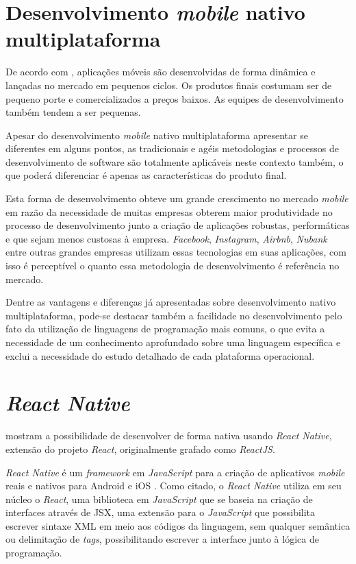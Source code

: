     \section{Desenvolvimento \textit{mobile} nativo multiplataforma}

    De acordo com , aplicações móveis são desenvolvidas de forma dinâmica e lançadas no mercado em pequenos ciclos. Os produtos finais costumam ser de pequeno porte e comercializados a preços baixos. As equipes de desenvolvimento também tendem a ser pequenas. 
    
    Apesar do desenvolvimento \textit{mobile} nativo multiplataforma apresentar se diferentes em alguns pontos, as tradicionais e agéis metodologias e processos de desenvolvimento de software são totalmente aplicáveis neste contexto também, o que poderá diferenciar é apenas as características do produto final.
    
    Esta forma de desenvolvimento obteve um grande crescimento no mercado \textit{mobile} em razão da necessidade de muitas empresas obterem maior produtividade no processo de desenvolvimento junto a criação de aplicações robustas, performáticas e que sejam menos custosas à empresa. \textit{Facebook}, \textit{Instagram}, \textit{Airbnb}, \textit{Nubank} entre outras grandes empresas utilizam essas tecnologias em suas aplicações, com isso é perceptível o quanto essa metodologia de desenvolvimento é referência no mercado.
    
    Dentre as vantagens e diferenças já apresentadas sobre desenvolvimento nativo multiplataforma, pode-se destacar também a facilidade no desenvolvimento pelo fato da utilização de linguagens de programação mais comuns, o que evita a necessidade de um conhecimento aprofundado sobre uma linguagem específica e exclui a necessidade do estudo detalhado de cada plataforma operacional.

    \section{\textit{React Native}}
    \label{react_native}

   mostram a possibilidade de desenvolver de forma nativa usando \textit{React Native}, extensão do projeto \textit{React}, originalmente grafado como \textit{ReactJS}.
  
  \textit{React Native} é um \textit{framework} em \textit{JavaScript} para a criação de aplicativos \textit{mobile} reais e nativos para Android e iOS \cite{Eisenman2015}. Como citado, o \textit{React Native} utiliza em seu núcleo o \textit{React}, uma biblioteca em \textit{JavaScript} que se baseia na criação de interfaces através de JSX, uma extensão para o \textit{JavaScript} que possibilita escrever sintaxe XML em meio aos códigos da linguagem, sem qualquer semântica ou delimitação de \textit{tags}, possibilitando escrever a interface junto à lógica de programação.
    
